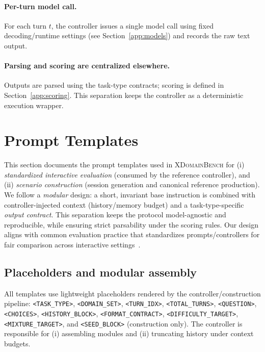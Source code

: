 \paragraph{Per-turn model call.}
For each turn $t$, the controller issues a single model call using fixed decoding/runtime settings (see Section~\ref{app:models}) and records the raw text output.

\paragraph{Parsing and scoring are centralized elsewhere.}
Outputs are parsed using the task-type contracts; scoring is defined in Section~\ref{app:scoring}.
This separation keeps the controller as a deterministic execution wrapper.

\section{Prompt Templates}
\label{app:prompts}

This section documents the prompt templates used in \textsc{XDomainBench} for
(i) \emph{standardized interactive evaluation} (consumed by the reference controller),
and (ii) \emph{scenario construction} (session generation and canonical reference production).
We follow a \emph{modular} design: a short, invariant base instruction is combined with controller-injected context (history/memory budget) and a task-type-specific \emph{output contract}.
This separation keeps the protocol model-agnostic and reproducible, while ensuring strict parsability under the scoring rules.
Our design aligns with common evaluation practice that standardizes prompts/controllers for fair comparison across interactive settings~\citep{liang2022helm,kiela-etal-2021-dynabench,liu2023agentbench,zhou2024webarena}.

\begingroup
{}
\lstset{style=xdbenchprompt}

\subsection{Placeholders and modular assembly}
\label{app:prompts_placeholders}

All templates use lightweight placeholders rendered by the controller/construction pipeline:
\texttt{<TASK\_TYPE>}, \texttt{<DOMAIN\_SET>}, \texttt{<TURN\_IDX>}, \texttt{<TOTAL\_TURNS>}, \texttt{<QUESTION>}, \texttt{<CHOICES>}, \texttt{<HISTORY\_BLOCK>}, \texttt{<FORMAT\_CONTRACT>}, \texttt{<DIFFICULTY\_TARGET>}, \texttt{<MIXTURE\_TARGET>}, and \texttt{<SEED\_BLOCK>} (construction only).
The controller is responsible for (i) assembling modules and (ii) truncating history under context budgets.
